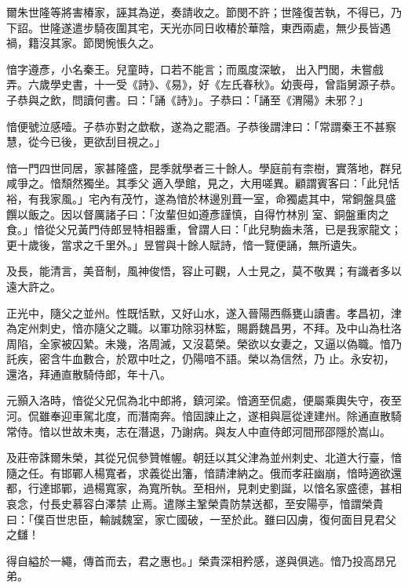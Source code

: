 \begin{pinyinscope}
 爾朱世隆等將害椿家，誣其為逆，奏請收之。節閔不許；世隆復苦執，不得已，乃下詔。世隆遂遣步騎夜圍其宅，天光亦同日收椿於華陰，東西兩處，無少長皆遇禍，籍沒其家。節閔惋悵久之。



 愔字遵彥，小名秦王。兒童時，口若不能言；而風度深敏，
 出入門閭，未嘗戲弄。六歲學史書，十一受《詩》、《易》，好《左氏春秋》。幼喪母，曾詣舅源子恭。子恭與之飲，問讀何書。曰：「誦《詩》」。子恭曰：「誦至《渭陽》未邪？」



 愔便號泣感噎。子恭亦對之歔欷，遂為之罷酒。子恭後謂津曰：「常謂秦王不甚察慧，從今已後，更欲刮目視之。」



 愔一門四世同居，家甚隆盛，昆季就學者三十餘人。學庭前有柰樹，實落地，群兒咸爭之。愔頹然獨坐。其季父適入學館，見之，大用嗟異。顧謂賓客曰：「此兒恬裕，有我家風。」宅內有茂竹，遂為愔於林邊別葺一室，命獨處其中，常銅盤具盛饌以飯之。因以督厲諸子曰：「汝輩但如遵彥謹慎，自得竹林別
 室、銅盤重肉之食。」愔從父兄黃門侍郎昱特相器重，曾謂人曰：「此兒駒齒未落，已是我家龍文；更十歲後，當求之千里外。」昱嘗與十餘人賦詩，愔一覽便誦，無所遺失。



 及長，能清言，美音制，風神俊悟，容止可觀，人士見之，莫不敬異；有識者多以遠大許之。



 正光中，隨父之並州。性既恬默，又好山水，遂入晉陽西縣甕山讀書。孝昌初，津為定州刺史，愔亦隨父之職。以軍功除羽林監，賜爵魏昌男，不拜。及中山為杜洛周陷，全家被囚縶。未幾，洛周滅，又沒葛榮。榮欲以女妻之，又逼以偽職。愔乃託疾，密含牛血數合，於眾中吐之，仍陽喑不語。榮以為信然，乃
 止。永安初，還洛，拜通直散騎侍郎，年十八。



 元顥入洛時，愔從父兄侃為北中郎將，鎮河梁。愔適至侃處，便屬乘輿失守，夜至河。侃雖奉迎車駕北度，而潛南奔。愔固諫止之，遂相與扈從達建州。除通直散騎常侍。愔以世故未夷，志在潛退，乃謝病。與友人中直侍郎河間邢邵隱於嵩山。



 及莊帝誅爾朱榮，其從兄侃參贊帷幄。朝廷以其父津為並州刺史、北道大行臺，愔隨之任。有邯鄲人楊寬者，求義從出籓，愔請津納之。俄而孝莊幽崩，愔時適欲還都，行達邯鄲，過楊寬家，為寬所執。至相州，見刺史劉誕，以愔名家盛德，甚相哀念，付長史慕容白澤禁
 止焉。遣隊主鞏榮貴防禁送都，至安陽亭，愔謂榮貴曰：「僕百世忠臣，輸誠魏室，家亡國破，一至於此。雖曰囚虜，復何面目見君父之讎！



 得自縊於一繩，傳首而去，君之惠也。」榮貴深相矜感，遂與俱逃。愔乃投高昂兄弟。




\end{pinyinscope}
